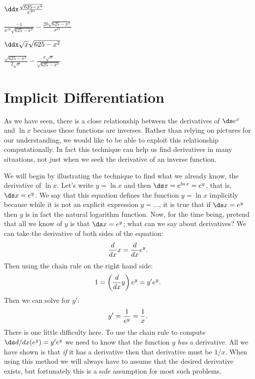 \begin{exercise} $\ddx\frac{\sqrt{625-x^2}}{x^{20}}$
\begin{answer} $\frac{-1}{x^{19}\sqrt{625-x^2}}-\frac{20\sqrt{625-x^2}}{x^{21}}$
\end{answer}\end{exercise}



\begin{exercise} $\ddx \sqrt{x}\sqrt{625-x^2}$
\begin{answer} $\frac{\sqrt{625-x^2}}{2\sqrt{x}}-\frac{x\sqrt{x}}{\sqrt{625-x^2}}$
\end{answer}\end{exercise}












\section{Implicit Differentiation}



As we have seen, there is a close relationship between the derivatives
of $\ds e^x$ and $\ln x$ because these functions are inverses. Rather
than relying on pictures for our understanding, we would like to be
able to exploit this relationship computationally.  In fact this
technique can help us find derivatives in many situations, not just
when we seek the derivative of an inverse function.

We will begin by illustrating the technique to find what we already
know, the derivative of $\ln x$. Let's write $y=\ln x$ and then $\ds
x=e^{\ln x}=e^y$, that is, $\ds x=e^y$. We say that this equation
defines the function $y=\ln x$ implicitly because while it is not an
explicit expression $y=\ldots$, it is true that if $\ds x=e^y$ then
$y$ is in fact the natural logarithm function. Now, for the time
being, pretend that all we know of $y$ is that $\ds x=e^y$; what can
we say about derivatives? We can take the derivative of both sides of
the equation:
$${d\over dx}x={d\over dx}e^y.$$
Then using the chain rule on the right hand side:
$$1 = \left({d\over dx}y\right) e^y = y'e^y.$$
Then we can solve for $y'$:
$$y'={1\over e^y} = {1\over x}.$$
There is one little difficulty here. To use the chain rule to compute 
$\ds d/dx(e^y)=y'e^y$ we need to know that the function $y$ {\it has\/} a
derivative. All we have shown is that {\it if\/} it has a derivative
then that derivative must be $1/x$. When using this method we will
always have to assume that the desired derivative exists, but
fortunately this is a safe assumption for most such problems. 

